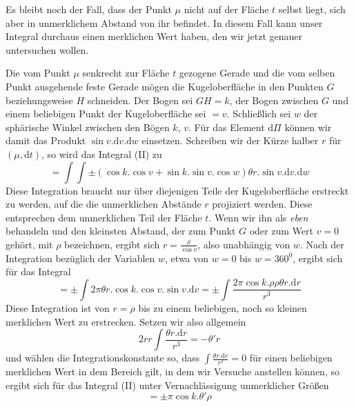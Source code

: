 Es bleibt noch der Fall, dass der Punkt $\mu$ nicht auf der Fläche $t$ selbst liegt, sich aber in unmerklichem Abstand von ihr befindet. In diesem Fall kann unser Integral durchaus einen merklichen Wert haben, den wir jetzt genauer untersuchen wollen.

Die vom Punkt $\mu$ senkrecht zur Fläche $t$ gezogene Gerade und die vom selben Punkt ausgehende feste Gerade mögen die Kugeloberfläche in den Punkten $G$ beziehungsweise $H$ schneiden. Der Bogen sei $GH=k$, der Bogen zwischen $G$ und einem beliebigen Punkt der Kugeloberfläche sei $=v$. Schließlich sei $w$ der sphärische Winkel zwischen den Bögen $k$, $v$. Für das Element $\mathrm{d}\Pi$ können wir damit das Produkt $\sin v.\mathrm{d}v.\mathrm{d}w$ einsetzen. Schreiben wir der Kürze halber $r$ für $(\mu,\mathrm{d}t)$, so wird das Integral (II) zu
\[
=\int\int\pm(\cos k.\cos v+\sin k.\sin v.\cos w)\theta r.\sin v.\mathrm{d}v.\mathrm{d}w
\]
Diese Integration braucht nur über diejenigen Teile der Kugeloberfläche erstreckt zu werden, auf die die unmerklichen Abstände $r$ projiziert werden. Diese entsprechen dem unmerklichen Teil der Fläche $t$. Wenn wir ihn als \textit{eben} behandeln und den kleinsten Abstand, der zum Punkt $G$ oder zum Wert $v=0$ gehört, mit $\rho$ bezeichnen, ergibt sich $r=\frac{\rho}{\cos v}$, also unabhängig von $w$. Nach der Integration bezüglich der Variablen $w$, etwa von $w=0$ bis $w=360^0$, ergibt sich für das Integral
\[
=\pm\int2\pi\theta r.\cos k.\cos v.\sin v.\mathrm{d}v=\pm\int\frac{2\pi\cos k.\rho\rho\theta r.\mathrm{d}r}{r^3}
\]
Diese Integration ist von $r=\rho$ bis zu einem beliebigen, noch so kleinen merklichen Wert zu erstrecken. Setzen wir also allgemein
\[
2rr\int\frac{\theta r.\mathrm{d}r}{r^3}=-\theta'r
\]
und wählen die Integrationskonstante so, dass $\int\frac{\theta r.\mathrm{d}r}{r^3}=0$ für einen beliebigen merklichen Wert in dem Bereich gilt, in dem wir Versuche anstellen können, so ergibt sich für das Integral (II) unter Vernachlässigung unmerklicher Größen
\[
=\pm\pi\cos k.\theta'\rho
\]


